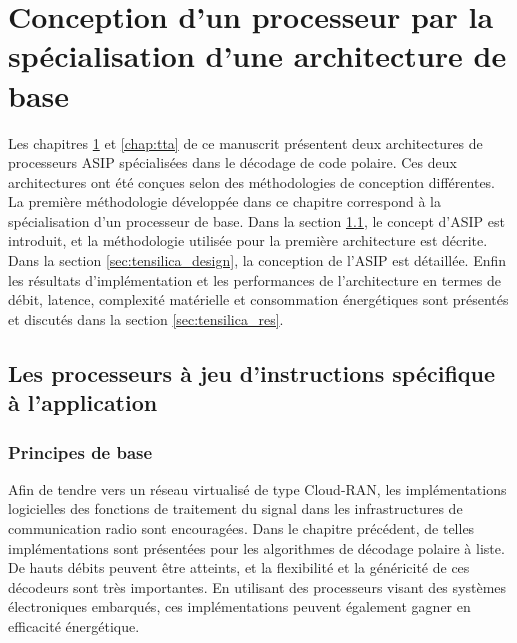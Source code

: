 
\chapter{Conception d'un processeur par la spécialisation d'une architecture de base} %
\label{chap:tensilica}

Les chapitres \ref{chap:tensilica} et \ref{chap:tta} de ce manuscrit présentent deux architectures de processeurs ASIP spécialisées dans le décodage de code polaire. Ces deux architectures ont été conçues selon des méthodologies de conception différentes. La première méthodologie développée dans ce chapitre correspond à la spécialisation d'un processeur de base. Dans la section \ref{sec:asips}, le concept d'ASIP est introduit, et la méthodologie utilisée pour la première architecture est décrite. Dans la section \ref{sec:tensilica_design}, la conception de l'ASIP est détaillée. Enfin les résultats d'implémentation et les performances de l'architecture en termes de débit, latence, complexité matérielle et consommation énergétiques sont présentés et discutés dans la section \ref{sec:tensilica_res}.

\vspace*{\fill}
\minitocTITI
\vspace*{\fill}
\newpage

\section{Les processeurs à jeu d'instructions spécifique à l'application}
\label{sec:asips}

\subsection{Principes de base}

Afin de tendre vers un réseau virtualisé de type Cloud-RAN, les implémentations logicielles des fonctions de traitement du signal dans les infrastructures de communication radio sont encouragées. Dans le chapitre précédent, de telles implémentations sont présentées pour les algorithmes de décodage polaire à liste. De hauts débits peuvent être atteints, et la flexibilité et la généricité de ces décodeurs sont très importantes. En utilisant des processeurs visant des systèmes électroniques embarqués, ces implémentations peuvent également gagner en efficacité énergétique.

